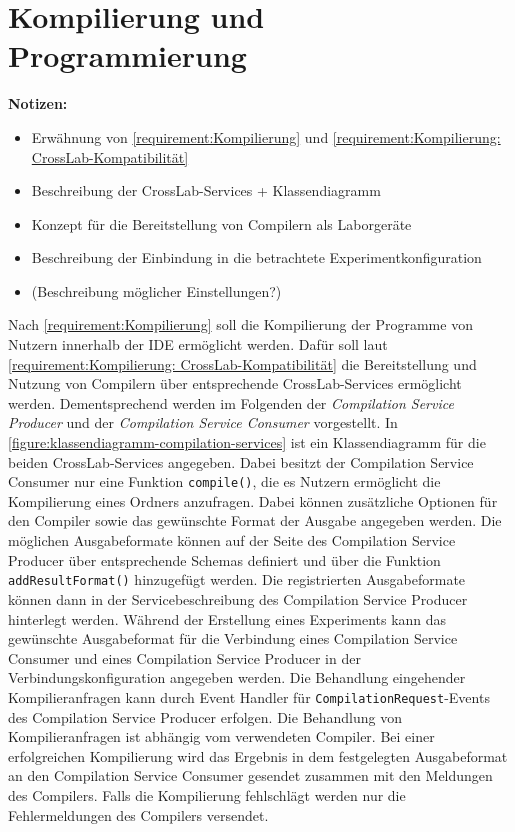 \section{Kompilierung und Programmierung}\label{section:konzeption:kompilierung-und-programmierung}


\begin{note}
    \textbf{Notizen:}
    \begin{itemize}
        \item Erwähnung von \autoref{requirement:Kompilierung} und \autoref{requirement:Kompilierung: CrossLab-Kompatibilität}
        \item Beschreibung der CrossLab-Services + Klassendiagramm
        \item Konzept für die Bereitstellung von Compilern als Laborgeräte
        \item Beschreibung der Einbindung in die betrachtete Experimentkonfiguration
        \item (Beschreibung möglicher Einstellungen?)
    \end{itemize}
\end{note}

Nach \autoref{requirement:Kompilierung} soll die Kompilierung der Programme von Nutzern innerhalb der IDE ermöglicht werden. Dafür soll laut \autoref{requirement:Kompilierung: CrossLab-Kompatibilität} die Bereitstellung und Nutzung von Compilern über entsprechende CrossLab-Services ermöglicht werden. Dementsprechend werden im Folgenden der \textit{Compilation Service Producer} und der \textit{Compilation Service Consumer} vorgestellt. In \autoref{figure:klassendiagramm-compilation-services} ist ein Klassendiagramm für die beiden CrossLab-Services angegeben. Dabei besitzt der Compilation Service Consumer nur eine Funktion \texttt{compile()}, die es Nutzern ermöglicht die Kompilierung eines Ordners anzufragen. Dabei können zusätzliche Optionen für den Compiler sowie das gewünschte Format der Ausgabe angegeben werden. Die möglichen Ausgabeformate können auf der Seite des Compilation Service Producer über entsprechende Schemas definiert und über die Funktion \texttt{addResultFormat()} hinzugefügt werden. Die registrierten Ausgabeformate können dann in der Servicebeschreibung des Compilation Service Producer hinterlegt werden. Während der Erstellung eines Experiments kann das gewünschte Ausgabeformat für die Verbindung eines Compilation Service Consumer und eines Compilation Service Producer in der Verbindungskonfiguration angegeben werden. Die Behandlung eingehender Kompilieranfragen kann durch Event Handler für \texttt{CompilationRequest}-Events des Compilation Service Producer erfolgen. Die Behandlung von Kompilieranfragen ist abhängig vom verwendeten Compiler. Bei einer erfolgreichen Kompilierung wird das Ergebnis in dem festgelegten Ausgabeformat an den Compilation Service Consumer gesendet zusammen mit den Meldungen des Compilers. Falls die Kompilierung fehlschlägt werden nur die Fehlermeldungen des Compilers versendet.

